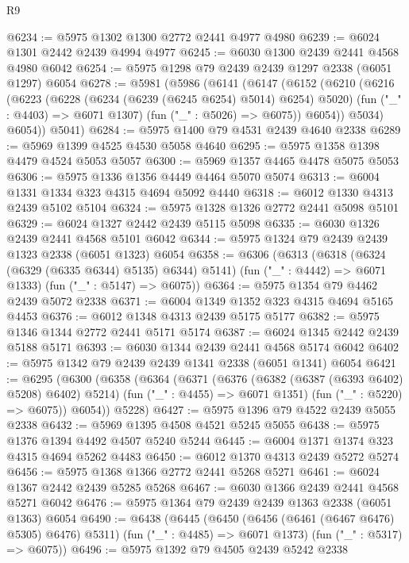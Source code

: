 \begin{lexlean}{R9}
\begin{coremodule}
@6234 := @5975 @1302 @1300 @2772 @2441 @4977 @4980
@6239 := @6024 @1301 @2442 @2439 @4994 @4977
@6245 := @6030 @1300 @2439 @2441 @4568 @4980 @6042
@6254 := @5975 @1298 @79 @2439 @2439 @1297 @2338 (@6051 @1297) @6054
@6278 := @5981
    (@5986
      (@6141
        (@6147
          (@6152
            (@6210
              (@6216
                (@6223
                  (@6228 (@6234 (@6239 (@6245 @6254) @5014) @6254) @5020)
                  (fun ("_" : @4403) => @6071 @1307)
                  (fun ("_" : @5026) => @6075))
                @6054))
            @5034)
          @6054))
      @5041)
@6284 := @5975 @1400 @79 @4531 @2439 @4640 @2338
@6289 := @5969 @1399 @4525 @4530 @5058 @4640
@6295 := @5975 @1358 @1398 @4479 @4524 @5053 @5057
@6300 := @5969 @1357 @4465 @4478 @5075 @5053
@6306 := @5975 @1336 @1356 @4449 @4464 @5070 @5074
@6313 := @6004 @1331 @1334 @323 @4315 @4694 @5092 @4440
@6318 := @6012 @1330 @4313 @2439 @5102 @5104
@6324 := @5975 @1328 @1326 @2772 @2441 @5098 @5101
@6329 := @6024 @1327 @2442 @2439 @5115 @5098
@6335 := @6030 @1326 @2439 @2441 @4568 @5101 @6042
@6344 := @5975 @1324 @79 @2439 @2439 @1323 @2338 (@6051 @1323) @6054
@6358 := @6306
    (@6313
      (@6318 (@6324 (@6329 (@6335 @6344) @5135) @6344) @5141)
      (fun ("_" : @4442) => @6071 @1333)
      (fun ("_" : @5147) => @6075))
@6364 := @5975 @1354 @79 @4462 @2439 @5072 @2338
@6371 := @6004 @1349 @1352 @323 @4315 @4694 @5165 @4453
@6376 := @6012 @1348 @4313 @2439 @5175 @5177
@6382 := @5975 @1346 @1344 @2772 @2441 @5171 @5174
@6387 := @6024 @1345 @2442 @2439 @5188 @5171
@6393 := @6030 @1344 @2439 @2441 @4568 @5174 @6042
@6402 := @5975 @1342 @79 @2439 @2439 @1341 @2338 (@6051 @1341) @6054
@6421 := @6295
    (@6300
      (@6358
        (@6364
          (@6371
            (@6376 (@6382 (@6387 (@6393 @6402) @5208) @6402) @5214)
            (fun ("_" : @4455) => @6071 @1351)
            (fun ("_" : @5220) => @6075))
          @6054))
      @5228)
@6427 := @5975 @1396 @79 @4522 @2439 @5055 @2338
@6432 := @5969 @1395 @4508 @4521 @5245 @5055
@6438 := @5975 @1376 @1394 @4492 @4507 @5240 @5244
@6445 := @6004 @1371 @1374 @323 @4315 @4694 @5262 @4483
@6450 := @6012 @1370 @4313 @2439 @5272 @5274
@6456 := @5975 @1368 @1366 @2772 @2441 @5268 @5271
@6461 := @6024 @1367 @2442 @2439 @5285 @5268
@6467 := @6030 @1366 @2439 @2441 @4568 @5271 @6042
@6476 := @5975 @1364 @79 @2439 @2439 @1363 @2338 (@6051 @1363) @6054
@6490 := @6438
    (@6445
      (@6450 (@6456 (@6461 (@6467 @6476) @5305) @6476) @5311)
      (fun ("_" : @4485) => @6071 @1373)
      (fun ("_" : @5317) => @6075))
@6496 := @5975 @1392 @79 @4505 @2439 @5242 @2338

\end{coremodule}
\end{lexlean}
